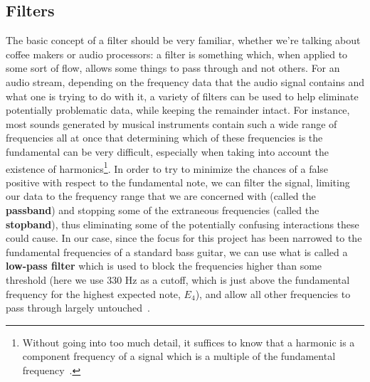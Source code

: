 \documentclass[12pt]{report}
\begin{document}
\subsection*{Filters}
\indent The basic concept of a filter should be very familiar, whether we're talking about coffee makers or audio processors: a filter is something which, when applied to some sort of flow, allows some things to pass through and not others. For an audio stream, depending on the frequency data that the audio signal contains and what one is trying to do with it, a variety of filters can be used to help eliminate potentially problematic data, while keeping the remainder intact. For instance, most sounds generated by musical instruments contain such a wide range of frequencies all at once that determining which of these frequencies is the fundamental can be very difficult, especially when taking into account the existence of harmonics\footnote{Without going into too much detail, it suffices to know that a harmonic is a component frequency of a signal which is a multiple of the fundamental frequency~\cite{Chisholm1911}.}. In order to try to minimize the chances of a false positive with respect to the fundamental note, we can filter the signal, limiting our data to the frequency range that we are concerned with (called the {\bf passband}) and stopping some of the extraneous frequencies (called the {\bf stopband}), thus eliminating some of the potentially confusing interactions these could cause. In our case, since the focus for this project has been narrowed to the fundamental frequencies of a standard bass guitar, we can use what is called a {\bf low-pass filter} which is used to block the frequencies higher than some threshold (here we use 330 Hz as a cutoff, which is just above the fundamental frequency for the highest expected note, $E_4$), and allow all other frequencies to pass through largely untouched~\cite[p.201]{Park2009}.
\end{document}
